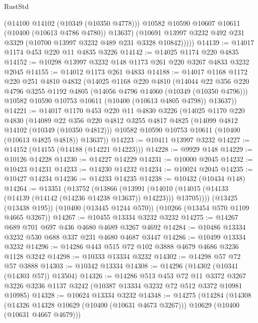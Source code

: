 \begin{lexlean}{RustStd}
\begin{coremodule}
{\begin{coremodule}
{{{{{{{{{{{{{{{{{{{{{{{{{            (@14100 @14102 (@10349 (@10350 @4778)))
            @10582
            @10590
            @10607
            @10611
            (@10400 (@10613 @4786 @4780))
            @13637)
          (@10691 @13997 @3232 @492 @231 @3329 (@10700 @13997 @3232 @489 @231 @3328 @10842)))))
@14139 := @14017 @1174 @453 @220 @11 @4835 @3226
@14142 := @14025 @1174 @220 @4835
@14152 := @10298 @13997 @3232 @148 @1173 @261 @220 @3267 @4833 @3232 @2045
@14155 := @14012 @1173 @261 @4833
@14188 := @14017
    @1168
    @1172
    @220
    @251
    @4810
    @4832
    (@14025
      @1168
      @220
      @4810
      (@14044
        @22
        @356
        @220
        @4796
        @3255
        @1192
        @4805
        (@14056 @4796 @14060 (@10349 (@10350 @4796)))
        @10582
        @10590
        @10753
        @10611
        (@10400 (@10613 @4805 @4798))
        @13637))
@14221 := @14017
    @1170
    @453
    @220
    @11
    @4830
    @3226
    (@14025
      @1170
      @220
      @4830
      (@14089
        @22
        @356
        @220
        @4812
        @3255
        @4817
        @4825
        (@14099 @4812 @14102 (@10349 (@10350 @4812)))
        @10582
        @10590
        @10753
        @10611
        (@10400 (@10613 @4825 @4818))
        @13637))
@14223 := @10411 @13997 @3232
@14227 := @14152 (@14155 (@14188 (@14221 @14223)))
@14228 := @9929 @148
@14229 := @10126 @14228
@14230 := @14227 @14229
@14231 := @10000 @2045
@14232 := @10423 @14231
@14233 := @14230 @14232
@14234 := @10024 @2045
@14235 := @10427 @14234
@14236 := @14233 @14235
@14238 := @10432 (@10434 @148)
@14264 := @13351
    (@13752
      (@13866
        (@13991 (@14010 (@14015 (@14133 (@14139 (@14142 (@14236 @14238 @13637)) @14223))) @13705))))
    (@13425 (@13438 @195))
    (@10400 (@13445 @1244 @570))
    (@10266 (@13454 @570 @1109 @4665 @3267))
@14267 := @10455 @13334 @3232 @3232
@14275 := @14267 @689 @701 @697 @436 @4680 @4689 @3267 @4692
@14284 := @10486 @13334 @3232 @530 @688 @337 @231 @4680 @4687 @3447
@14286 := @10499 @13334 @3232
@14296 := @14286 @443 @515 @72 @102 @3888 @4679 @4686 @3236 @1128 @3242
@14298 := @10333 @13334 @3232
@14302 := @14298 @57 @72 @57 @3888
@14303 := @10342 @13334
@14308 := @14296 (@14302 (@10341 (@14303 @57)) @13504)
@14326 := @14286
    @513
    @453
    @72
    @11
    @3372
    @3267
    @3226
    @3236
    @1137
    @3242
    (@10387 @13334 @3232 @72 @512 @3372 @10981 @10985)
@14328 := @10624 @13334 @3232
@14348 := @14275
    (@14284
      (@14308
        (@14326 @14328 @10629 (@10400 (@10631 @4673 @3267)))
        @10629
        (@10400 (@10631 @4667 @4679)))
}}}}}}}}}}}}}}}}}}}}}}}}}
\end{coremodule}}
\end{coremodule}
\end{lexlean}
